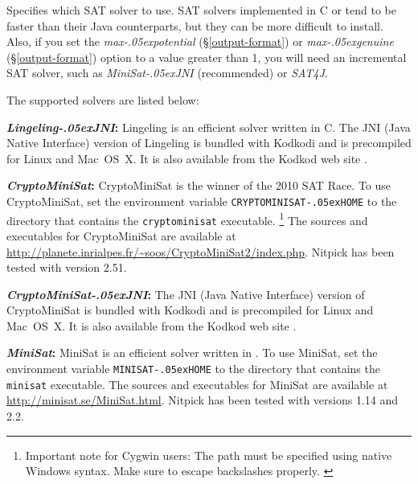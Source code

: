 \documentclass[a4paper,12pt]{article}
\renewcommand\_{\hbox{\textunderscore\kern-.05ex}}
\begin{document}
\begin{enum}
\opdefault{sat\_solver}{string}{smart}
Specifies which SAT solver to use. SAT solvers implemented in C or \cpp{} tend
to be faster than their Java counterparts, but they can be more difficult to
install. Also, if you set the \textit{max\_potential} (\S\ref{output-format}) or
\textit{max\_genuine} (\S\ref{output-format}) option to a value greater than 1,
you will need an incremental SAT solver, such as \textit{MiniSat\_JNI}
(recommended) or \textit{SAT4J}.

The supported solvers are listed below:

\begin{enum}

\item[\labelitemi] \textbf{\textit{Lingeling\_JNI}:}
Lingeling is an efficient solver written in C. The JNI (Java Native Interface)
version of Lingeling is bundled with Kodkodi and is precompiled for Linux and
Mac~OS~X. It is also available from the Kodkod web site \cite{kodkod-2009}.

\item[\labelitemi] \textbf{\textit{CryptoMiniSat}:} CryptoMiniSat is the winner of
the 2010 SAT Race. To use CryptoMiniSat, set the environment variable
\texttt{CRYPTO\-MINISAT\_}\discretionary{}{}{}\texttt{HOME} to the directory that contains the \texttt{crypto\-minisat}
executable.%
\footnote{Important note for Cygwin users: The path must be specified using
native Windows syntax. Make sure to escape backslashes properly.%
\label{cygwin-paths}}
The \cpp{} sources and executables for Crypto\-Mini\-Sat are available at
\url{http://planete.inrialpes.fr/~soos/}\allowbreak\url{CryptoMiniSat2/index.php}.
Nitpick has been tested with version 2.51.

\item[\labelitemi] \textbf{\textit{CryptoMiniSat\_JNI}:} The JNI (Java Native
Interface) version of CryptoMiniSat is bundled with Kodkodi and is precompiled
for Linux and Mac~OS~X. It is also available from the Kodkod web site
\cite{kodkod-2009}.

\item[\labelitemi] \textbf{\textit{MiniSat}:} MiniSat is an efficient solver
written in \cpp{}. To use MiniSat, set the environment variable
\texttt{MINISAT\_HOME} to the directory that contains the \texttt{minisat}
executable.%
The \cpp{} sources and executables for MiniSat are available at
\url{http://minisat.se/MiniSat.html}. Nitpick has been tested with versions 1.14
and 2.2.


\end{enum}
\end{enum}
\end{document}

